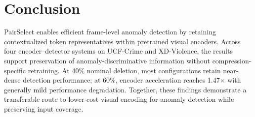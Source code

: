 \section{Conclusion}
\label{sec:conclusion}
PairSelect enables efficient frame-level anomaly detection by retaining contextualized token representatives within pretrained visual encoders. Across four encoder--detector systems on UCF-Crime and XD-Violence, the results support preservation of anomaly-discriminative information without compression-specific retraining. At 40\% nominal deletion, most configurations retain near-dense detection performance; at 60\%, encoder acceleration reaches 1.47$\times$ with generally mild performance degradation. Together, these findings demonstrate a transferable route to lower-cost visual encoding for anomaly detection while preserving input coverage.
